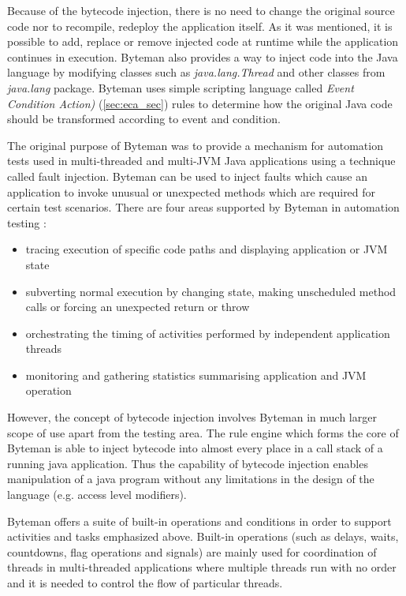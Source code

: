 \documentclass[12pt,oneside]{fithesis2}
\begin{document}
Because of the bytecode injection, there is no need to change the original source code nor to recompile, redeploy the application itself. As it was mentioned, it is possible to add, replace or remove injected code at runtime while the application continues in execution. Byteman also provides a way to inject code into the Java language by modifying classes such as \textit{java.lang.Thread} and other classes from \textit{java.lang} package. Byteman uses simple scripting language called \textit{Event Condition Action)} (\ref{sec:eca_sec}) rules to determine how the original Java code should be transformed according to event and condition.

The original purpose of Byteman was to provide a mechanism for automation tests used in multi-threaded and multi-JVM Java applications using a technique called fault injection. Byteman can be used to inject faults which cause an application to invoke unusual or unexpected methods which are required for certain test scenarios. There are four areas supported by Byteman in automation testing \cite[Introduction to Byteman]{byteman_doc}:

\begin{itemize}
   \item tracing execution of specific code paths and displaying application or JVM state
   \item subverting normal execution by changing state, making unscheduled method calls or forcing an unexpected return or throw
   \item orchestrating the timing of activities performed by independent application threads
   \item monitoring and gathering statistics summarising application and JVM operation
\end{itemize}

However, the concept of bytecode injection involves Byteman in much larger scope of use apart from the testing area. The rule engine which forms the core of Byteman is able to inject bytecode into
almost every place in a call stack of a running java application. Thus the capability of bytecode injection enables manipulation of a java program without any limitations in the design of the language (e.g. access level modifiers).

Byteman offers a suite of built-in operations and conditions in order to support activities and tasks emphasized above. Built-in operations (such as delays, waits, countdowns, flag operations and signals) are mainly used for coordination of threads in multi-threaded applications where multiple threads run with no order and it is needed to control the flow of particular threads.
\end{document}
